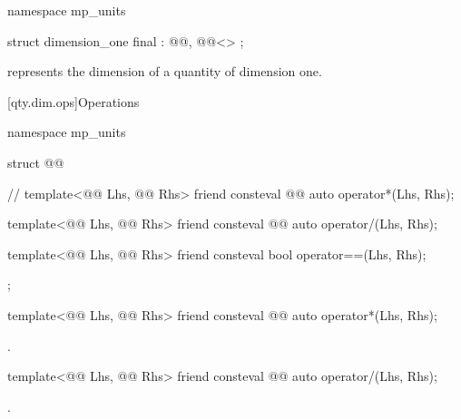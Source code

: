 \begin{codeblock}
namespace mp_units {

struct dimension_one final : @@, @@<> {};

}
\end{codeblock}

\pnum
{} represents the dimension of a quantity of dimension one.

[qty.dim.ops]{Operations}

\begin{codeblock}
namespace mp_units {

struct @@ {  // \expos
  template<@@ Lhs, @@ Rhs>
  friend consteval @@ auto operator*(Lhs, Rhs);

  template<@@ Lhs, @@ Rhs>
  friend consteval @@ auto operator/(Lhs, Rhs);

  template<@@ Lhs, @@ Rhs>
  friend consteval bool operator==(Lhs, Rhs);
};

}
\end{codeblock}

\begin{itemdecl}
template<@@ Lhs, @@ Rhs>
friend consteval @@ auto operator*(Lhs, Rhs);
\end{itemdecl}

\begin{itemdescr}
\pnum
\returns
{}.
\end{itemdescr}

\begin{itemdecl}
template<@@ Lhs, @@ Rhs>
friend consteval @@ auto operator/(Lhs, Rhs);
\end{itemdecl}

\begin{itemdescr}
\pnum
\returns
{}.
\end{itemdescr}


